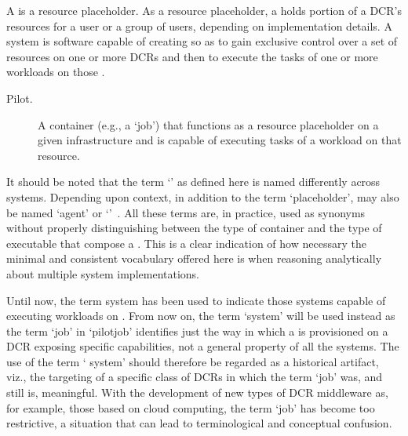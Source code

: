 \documentclass{sig-alternate}
\begin{document}

A \pilot is a resource placeholder. As a resource placeholder, a \pilot holds
portion of a DCR's resources for a user or a group of users, depending on
implementation details. A \pilotjob system is software capable of creating
\pilots so as to gain exclusive control over a set of resources on one or more
DCRs and then to execute the tasks of one or more workloads on those \pilots.
 

\begin{description}

\item[Pilot.] A container (e.g., a `job') that functions as a resource
placeholder on a given infrastructure and is capable of executing tasks of a
workload on that resource.

\end{description}

It should be noted that the term `\pilot' as defined here is named differently
across \pilotjob systems. Depending upon context, in addition to the term
`placeholder', \pilot may also be named `agent' or
`\pilotjob'~\cite{moscicki2011,pinchak2002}. All these terms are, in practice,
used as synonyms without properly distinguishing between the type of container
and the type of executable that compose a \pilot. This is a clear indication of
how necessary the minimal and consistent vocabulary offered here is when
reasoning analytically about multiple \pilotjob system implementations.

Until now, the term \pilotjob system has been used to indicate those systems
capable of executing workloads on \pilots. From now on, the term `\pilot system'
will be used instead as the term `job' in `pilotjob' identifies just the way in
which a \pilot is provisioned on a DCR exposing specific capabilities, not a
general property of all the \pilotjob systems. The use of the term `\pilotjob
system' should therefore be regarded as a historical artifact, viz., the
targeting of a specific class of DCRs in which the term `job' was, and still is,
meaningful. With the development of new types of DCR middleware as, for example,
those based on cloud computing, the term `job' has become too restrictive, a
situation that can lead to terminological and conceptual confusion.
 
\end{document}
